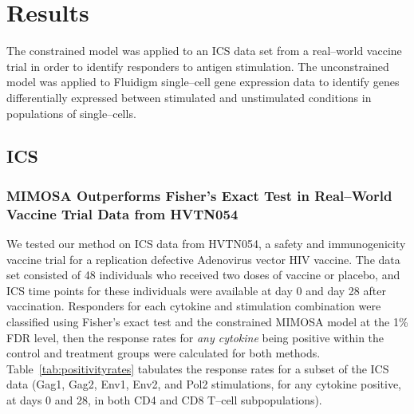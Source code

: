 \documentclass[11pt]{article}
\begin{document}
\section{Results}
The constrained model was applied to an ICS data set from a real--world vaccine trial in order to identify responders to antigen stimulation. The unconstrained model was applied to Fluidigm single--cell gene expression data to identify genes differentially expressed between stimulated and unstimulated conditions in populations of single--cells.

\subsection{ICS}
\subsubsection*{MIMOSA Outperforms Fisher's Exact Test in Real--World Vaccine Trial Data from HVTN054}

We tested our method on ICS data from HVTN054, a safety and immunogenicity vaccine trial for a replication defective Adenovirus vector HIV vaccine. The data set consisted of 48 individuals who received two doses of vaccine or placebo, and ICS time points for these individuals were available at day 0 and day 28 after vaccination. Responders for each cytokine and stimulation combination were classified using Fisher's exact test and the constrained MIMOSA model at the 1\% FDR level, then the response rates for \textit{any cytokine} being positive within the control and treatment groups were calculated for both methods. Table~\ref{tab:positivityrates} tabulates the response rates for a subset of the ICS data (Gag1, Gag2, Env1, Env2, and Pol2 stimulations, for any cytokine positive, at days 0 and 28, in both CD4 and CD8 T--cell subpopulations). 
\end{document}

